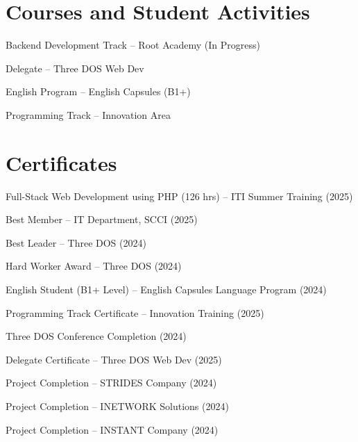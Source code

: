 \documentclass[letterpaper,10pt]{article}
\newenvironment{resume_list}{
  \vspace{-7pt}
  \begin{itemize}[itemsep=-2px, parsep=1pt, leftmargin=30pt]
}{
  \end{itemize}
}
\begin{document}
\section{Courses and Student Activities}
\begin{resume_list}
  \item Backend Development Track -- Root Academy (In Progress)
  \item Delegate -- Three DOS Web Dev
  \item English Program -- English Capsules (B1+)
  \item Programming Track -- Innovation Area
\end{resume_list}

\section{Certificates}
\begin{resume_list}
  \item Full-Stack Web Development using PHP (126 hrs) -- ITI Summer Training (2025)
  \item Best Member -- IT Department, SCCI (2025)
  \item Best Leader -- Three DOS (2024)
  \item Hard Worker Award -- Three DOS (2024)
  \item English Student (B1+ Level) -- English Capsules Language Program (2024)
  \item Programming Track Certificate -- Innovation Training (2025)
  \item Three DOS Conference Completion (2024)
  \item Delegate Certificate -- Three DOS Web Dev (2025)
  \item Project Completion -- STRIDES Company (2024)
  \item Project Completion -- INETWORK Solutions (2024)
  \item Project Completion -- INSTANT Company (2024)
\end{resume_list}
\end{document}
